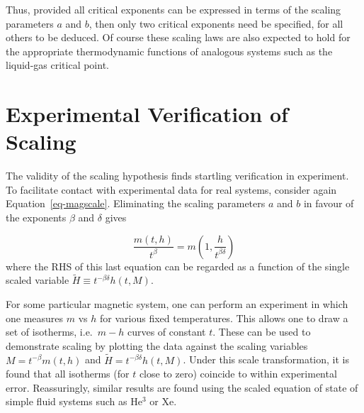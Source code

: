 \documentclass[
  letterpaper,
  enabledeprecatedfontcommands]{report}
\begin{document}
Thus, provided all critical exponents can be expressed in terms of the
scaling parameters \(a\) and \(b\), then only two critical exponents
need be specified, for all others to be deduced. Of course these scaling
laws are also expected to hold for the appropriate thermodynamic
functions of analogous systems such as the liquid-gas critical point.

\section{Experimental Verification of
Scaling}\label{experimental-verification-of-scaling}

The validity of the scaling hypothesis finds startling verification in
experiment. To facilitate contact with experimental data for real
systems, consider again Equation~\ref{eq-magscale}. Eliminating the
scaling parameters \(a\) and \(b\) in favour of the exponents \(\beta\)
and \(\delta\) gives

\[
\frac{m(t,h)}{t^{\beta}}=m(1,\frac{h}{t^{\beta\delta}})
\] where the RHS of this last equation can be regarded as a function of
the single scaled variable \(\tilde{H} \equiv t^{-\beta\delta} h(t,M)\).

For some particular magnetic system, one can perform an experiment in
which one measures \(m\) vs \(h\) for various fixed temperatures. This
allows one to draw a set of isotherms, i.e.~\(m-h\) curves of constant
\(t\). These can be used to demonstrate scaling by plotting the data
against the scaling variables \(M=t^{-\beta}m(t,h)\) and
\(\tilde{H}=t^{-\beta\delta}h(t,M)\). Under this scale transformation,
it is found that all isotherms (for \(t\) close to zero) coincide to
within experimental error. Reassuringly, similar results are found using
the scaled equation of state of simple fluid systems such as He\(^3\) or
Xe.
\end{document}
